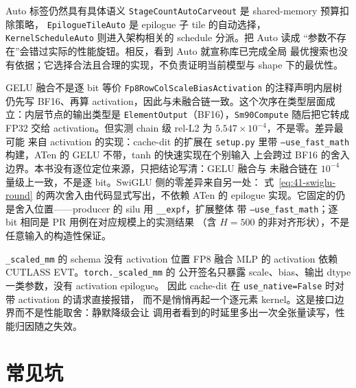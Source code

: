 \begin{kaogu}[F2]{Auto 标签仍然具有具体语义}
\texttt{StageCountAuto}\allowbreak\texttt{Carveout} 是 shared-memory 预算扣除策略，
\texttt{EpilogueTile}\allowbreak\texttt{Auto} 是 epilogue 子 tile 的自动选择，
\texttt{KernelSchedule}\allowbreak\texttt{Auto} 则进入架构相关的 schedule 分派。把 Auto 读成
“参数不存在”会错过实际的性能旋钮。相反，看到 Auto 就宣称库已完成全局
最优搜索也没有依据；它选择合法且合理的实现，不负责证明当前模型与 shape
下的最优性。
\end{kaogu}

\begin{kaogu}[F4]{GELU 融合不是逐 bit 等价}
\texttt{Fp8RowColScaleBiasActivation} 的注释声明内层树仍先写 BF16、再算
activation，因此与未融合链一致。这个次序在类型层面成立：内层节点的输出类型是
\texttt{ElementOutput}（BF16），\texttt{Sm90Compute} 随后把它转成 FP32 交给
activation。但实测 chain 级 rel-L2 为 $5.547\times10^{-4}$，不是零。差异最可能
来自 activation 的实现：cache-dit 的扩展在 \texttt{setup.py} 里带
\texttt{--use\_fast\_math} 构建，ATen 的 GELU 不带，tanh 的快速实现在个别输入
上会跨过 BF16 的舍入边界。本书没有逐位定位来源，只把结论写清：GELU 融合与
未融合链在 $10^{-4}$ 量级上一致，不是逐 bit。SwiGLU 侧的零差异来自另一处：
式~\ref{eq:41-swiglu-round} 的两次舍入由代码显式写出，不依赖 ATen 的 epilogue
实现。它固定的仍是舍入位置——producer 的 silu 用 \texttt{\_\_expf}，扩展整体
带 \texttt{--use\_fast\_math}；逐 bit 相同是 PR 用例在对应规模上的实测结果
（含 $H=500$ 的非对齐形状），不是任意输入的构造性保证。
\end{kaogu}

\begin{kaogu}[F2]{\texttt{\_scaled\_mm} 的 schema 没有 activation 位置}
FP8 融合 MLP 的 activation 依赖 CUTLASS EVT。\texttt{torch.\_scaled\_mm} 的
公开签名只暴露 scale、bias、输出 dtype 一类参数，没有 activation epilogue。
因此 cache-dit 在 \texttt{use\_native=False} 时对带 activation 的请求直接报错，
而不是悄悄再起一个逐元素 kernel。这是接口边界而不是性能取舍：静默降级会让
调用者看到的时延里多出一次全张量读写，性能归因随之失效。
\end{kaogu}

\section{常见坑}

